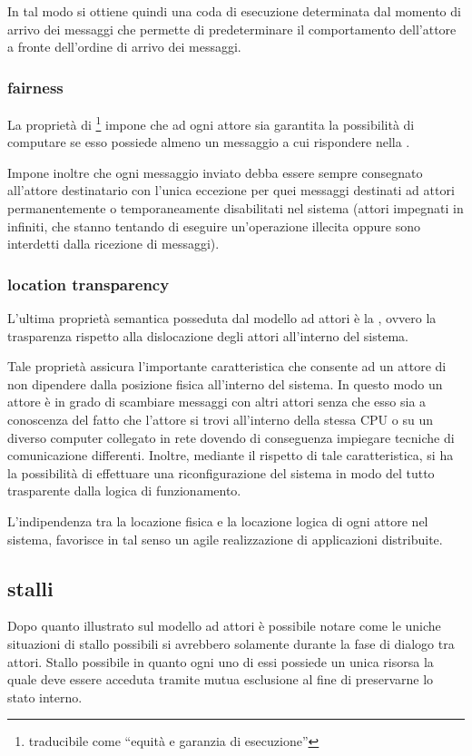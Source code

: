In tal modo si ottiene quindi una coda di esecuzione determinata dal momento di arrivo dei messaggi che permette di predeterminare il comportamento dell'attore a fronte dell'ordine di arrivo dei messaggi.

\subsubsection*{fairness}
La proprietà di \footnote{traducibile come ``equità e garanzia di esecuzione''} impone che ad ogni attore sia garantita la possibilità di computare se esso possiede almeno un messaggio a cui rispondere nella .

Impone inoltre che ogni messaggio inviato debba essere sempre consegnato all'attore destinatario con l'unica eccezione per quei messaggi destinati ad attori permanentemente o temporaneamente disabilitati nel sistema (attori impegnati in  infiniti, che stanno tentando di eseguire un'operazione illecita oppure sono interdetti dalla ricezione di messaggi).

\subsubsection*{location transparency}
L'ultima proprietà semantica posseduta dal modello ad attori è la , ovvero la trasparenza rispetto alla dislocazione degli attori all'interno del sistema. 

Tale proprietà assicura l'importante caratteristica che consente ad un attore di non dipendere dalla posizione fisica all'interno del sistema. In questo modo un attore è in grado di scambiare messaggi con altri attori senza che esso sia a conoscenza del fatto che l'attore si trovi all'interno della stessa CPU o su un diverso computer collegato in rete dovendo di conseguenza impiegare tecniche di comunicazione differenti. Inoltre, mediante il rispetto di tale caratteristica, si ha la possibilità di effettuare una riconfigurazione del sistema in modo del tutto trasparente dalla logica di funzionamento.

L'indipendenza tra la locazione fisica e la locazione logica di ogni attore nel sistema, favorisce in tal senso un agile realizzazione di applicazioni distribuite.

\subsection*{stalli}
\label{analisi-della-soluzione-concorrenza-stalli}
Dopo quanto illustrato sul modello ad attori è possibile notare come le uniche situazioni di stallo possibili si avrebbero solamente durante la fase di dialogo tra attori. Stallo possibile  in quanto ogni uno di essi possiede un unica risorsa  la quale deve essere acceduta tramite mutua esclusione al fine di preservarne lo stato interno.

